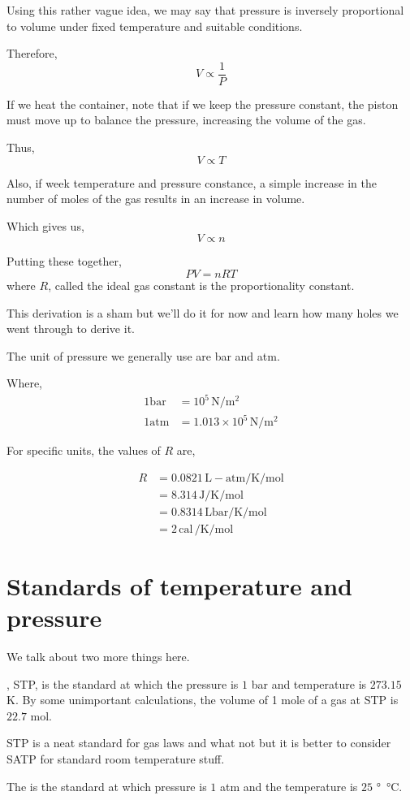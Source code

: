 Using this rather vague idea, we may say that pressure is inversely proportional to
volume under fixed temperature and suitable conditions. 

Therefore, 
\[ V \propto \frac{1}{P}\]

If we heat the container, note that if we keep the pressure constant,
the piston must move up to balance the pressure, increasing the volume of the gas.

Thus, 
\[ V \propto T\]

Also, if week temperature and pressure constance, a simple increase
in the number of moles of the gas results in an increase in volume. 


Which gives us,
\[ V \propto n\]

Putting these together, 
\[ PV = nRT\]
where \(R\), called the ideal gas constant is the proportionality constant.

This derivation is a sham but we'll do it for now and learn how many holes we went through
to derive it.

The unit of pressure we generally use are bar and atm. 

Where, 
\begin{align*}
    1 \si{\bar} &= 10^5 \, \si{\newton\per\meter\squared} \\
    1 \mathrm{atm} &= 1.013 \times 10^5 \, \si{\newton\per\meter\squared}
\end{align*}

For specific units, the values of \(R\) are,

\begin{align*}
    R &= 0.0821 \, \si{\liter} - \mathrm{atm} \si{\per\kelvin\per\mole} \\
    &= 8.314 \, \si{\joule\per\kelvin\per\mole} \\
    &= 0.8314 \, \si{\liter\bar\per\kelvin\per\mole} \\
    &= 2 \, \mathrm{cal}\,\si{\per\kelvin\per\mole}
\end{align*}

\section{Standards of temperature and pressure}

We talk about two more things here.

\begin{definition}
  , STP, is
  the standard at which the pressure is \(1\) \si{\bar} and 
  temperature is \(273.15\) \si{\kelvin}.
  By some unimportant calculations, the volume of 1 mole 
  of a gas at STP is \(22.7\) \si{\mole}.
\end{definition}

STP is a neat standard for gas laws and what not but it is better
to consider SATP for standard room temperature stuff.

\begin{definition}
  The  is the 
  standard at which pressure is \(1\) atm and the temperature is \(25\) \si{\degree\celsius}.
\end{definition}